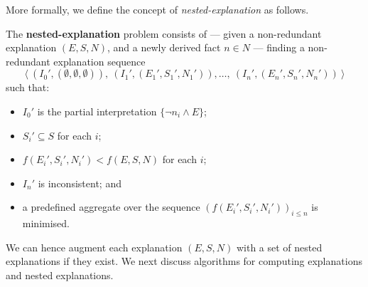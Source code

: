More formally, we define the concept of \emph{nested-explanation} as follows. 

\begin{definition}
The \textbf{nested-explanation} problem consists of --- given a non-redundant explanation $(E, S, N)$, and a newly derived fact $n \in N$ --- finding a non-redundant explanation sequence 
    \[\langle \ (I_0',(\emptyset,\emptyset,\emptyset)),\ (I_1',(E_1',S_1',N_1')), \dots ,\ (I_n',(E_n',S_n',N_n')) \ \rangle\]
    such that:
    \begin{itemize}
        \item $I_0'$ is the partial interpretation $\{ \neg n_i \wedge E \}$;
        \item $S_i'\subseteq S$ for each $i$;
        \item $f(E_i',S_i',N_i')< f(E, S, N)$ for each $i$; 
        \item $I_n'$ is inconsistent; and
        \item a predefined aggregate over the sequence $\left(f(E_i',S_i',N_i')\right)_{i\leq n}$ is minimised.
    \end{itemize}
\end{definition}

We can hence augment each explanation $(E,S,N)$ with a set of nested explanations if they exist. We next discuss algorithms for computing explanations and nested explanations.




